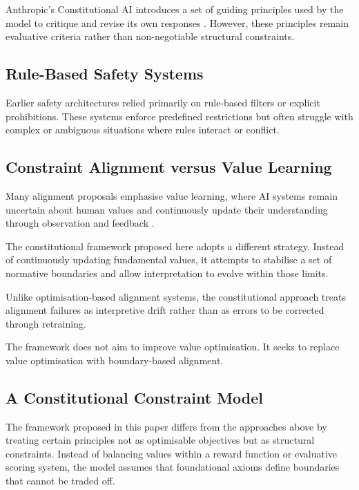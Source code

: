 \documentclass[11pt]{article}
\begin{document}
Anthropic's Constitutional AI introduces a set of guiding principles used by the model to critique and revise its own responses \cite{bai2022constitutional}. However, these principles remain evaluative criteria rather than non-negotiable structural constraints.

\subsection{Rule-Based Safety Systems}

Earlier safety architectures relied primarily on rule-based filters or explicit prohibitions. These systems enforce predefined restrictions but often struggle with complex or ambiguous situations where rules interact or conflict.

\subsection{Constraint Alignment versus Value Learning}

Many alignment proposals emphasise value learning, where AI systems remain uncertain about human values and continuously update their understanding through observation and feedback \cite{russell2019humancompatible}.

The constitutional framework proposed here adopts a different strategy. Instead of continuously updating fundamental values, it attempts to stabilise a set of normative boundaries and allow interpretation to evolve within those limits.

Unlike optimisation-based alignment systems, the constitutional approach treats alignment failures as interpretive drift rather than as errors to be corrected through retraining.

The framework does not aim to improve value optimisation. It seeks to replace value optimisation with boundary-based alignment.

\subsection{A Constitutional Constraint Model}

The framework proposed in this paper differs from the approaches above by treating certain principles not as optimisable objectives but as structural constraints. Instead of balancing values within a reward function or evaluative scoring system, the model assumes that foundational axioms define boundaries that cannot be traded off.
\end{document}
